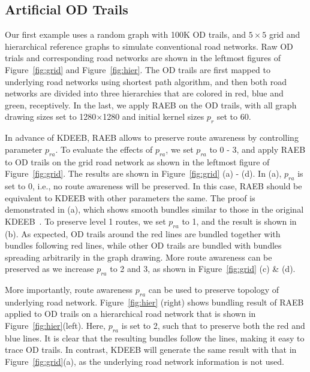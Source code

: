 \subsection{Artificial OD Trails}
\label{ssec:study1}

Our first example uses a random graph with 100K OD trails, and $5 \times 5$ grid and hierarchical reference graphs to simulate conventional road networks.
Raw OD trials and corresponding road networks are shown in the leftmost figures of Figure~\ref{fig:grid} and Figure~\ref{fig:hier}.
The OD trails are first mapped to underlying road networks using shortest path algorithm, and then both road networks are divided into three hierarchies that are colored in red, blue and green, receptively.
In the last, we apply RAEB on the OD trails, with all graph drawing sizes set to 1280$\times$1280 and initial kernel sizes $p_r$ set to 60.

In advance of KDEEB, RAEB allows to preserve route awareness by controlling parameter $p_{ra}$.
To evaluate the effects of $p_{ra}$, we set $p_{ra}$ to 0 - 3, and apply RAEB to OD trails on the grid road network as shown in the leftmost figure of Figure~\ref{fig:grid}.
The results are shown in Figure~\ref{fig:grid} (a) - (d).
In (a), $p_{ra}$ is set to 0, i.e., no route awareness will be preserved.
In this case, RAEB should be equivalent to KDEEB with other parameters the same.
The proof is demonstrated in (a), which shows smooth bundles similar to those in the original KDEEB~\cite{hurter2012graph}.
To preserve level 1 routes, we set $p_{ra}$ to 1, and the result is shown in (b).
As expected, OD trails around the red lines are bundled together with bundles following red lines, while other OD trails are bundled with bundles spreading arbitrarily in the graph drawing.
More route awareness can be preserved as we increase $p_{ra}$ to 2 and 3, as shown in Figure~\ref{fig:grid} (c) \& (d).

More importantly, route awareness $p_{ra}$ can be used to preserve topology of underlying road network.
Figure~\ref{fig:hier} (right) shows bundling result of RAEB applied to OD trails on a hierarchical road network that is shown in Figure~\ref{fig:hier}(left).
Here, $p_{ra}$ is set to 2, such that to preserve both the red and blue lines.
It is clear that the resulting bundles follow the lines, making it easy to trace OD trails.
In contrast, KDEEB will generate the same result with that in Figure~\ref{fig:grid}(a), as the underlying road network information is not used.

